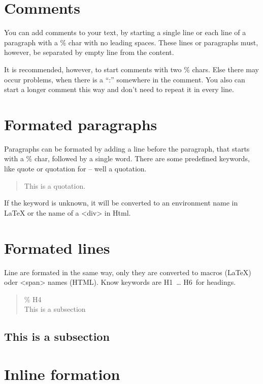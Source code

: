 \documentclass{article}
\begin{document}
\section{Comments}

You can add comments to your text, by starting a single line
or each line of a paragraph with a \% char with no leading
spaces. These lines or paragraphs must, however, be
separated by empty line from the content.



It is recommended, however, to start comments with two \% chars.
Else there may occur problems, when there is a "`:"' somewhere
in the comment. You also can start a longer comment this way
and don't need to repeat it in every line.


\section{Formated paragraphs}

Paragraphs can be formated by adding a line before the
paragraph, that starts with a \% char, followed by a single
word. There are some predefined keywords, like quote or
quotation for – well a quotation.

\begin{quote}
This is a quotation.

\end{quote}

If the keyword is unknown, it will be converted to an environment
name in LaTeX or the name of a <div> in Html.

\section{Formated lines}

Line are formated in the same way, only they are converted
to macros (LaTeX) oder <span> names (HTML). Know keywords
are H1~… H6~for headings.

\begin{quote}
  \% H4\\
  This is a subsection\\

\end{quote}

\subsection{This is a subsection}

\section{Inline formation}
\end{document}
